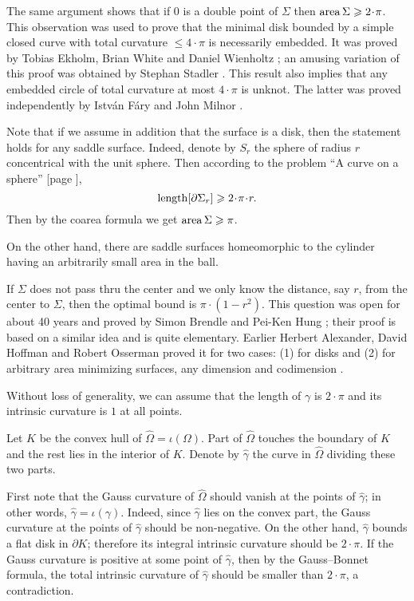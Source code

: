 The same argument shows that if $0$ is a double point
of $\Sigma$ then $\area\Sigma\z\ge 2\cdot \pi$.
This observation was used to prove 
that the minimal disk bounded by a simple closed curve with total curvature $\le 4\cdot\pi$ 
is necessarily embedded.
It was proved by 
Tobias Ekholm, 
Brian White 
and Daniel Wienholtz
\cite{EWW};
an amusing variation of this proof
was obtained by 
Stephan Stadler \cite{stadler-FM}.
This result also implies that any embedded circle of total curvature at most $4\cdot\pi$ is unknot.
The latter was proved independently by Istv{\'a}n F{\'a}ry \cite{fary-knot} and  John Milnor \cite{milnor}.

Note that if we assume in addition that the surface is a disk,
then the statement holds for any saddle surface. 
Indeed, denote by $S_r$ the sphere of radius $r$ concentrical with the unit sphere. 
Then according to the problem ``A curve on a sphere'' [page \pageref{A curve in a sphere}], 
\[\length[\partial\Sigma_r]\ge 2\cdot\pi\cdot r.\]
Then by the coarea formula we get $\operatorname{\rm area}\nolimits\Sigma\geqslant \pi$.

On the other hand, there are saddle surfaces homeomorphic to the cylinder
having an arbitrarily small area in the ball. 

If $\Sigma$ does not pass thru the center 
and we only know the distance, say $r$, 
from the center to $\Sigma$,
then the optimal bound is $\pi\cdot(1-r^2)$.
This question was open for about 40 years and proved by Simon Brendle and Pei-Ken Hung \cite{brende-hung};
their proof is based on a similar idea and is quite elementary.
Earlier Herbert Alexander, 
David Hoffman
and Robert Osserman 
proved it for two cases: (1) for disks and (2) for arbitrary area minimizing surfaces, any dimension and codimension
 \cite{alexander-osserman,alexander-hoffman-osserman}.






Without loss of generality, we can assume that the length of $\gamma$ is $2{\cdot}\pi$ and its intrinsic curvature is $1$ at all points.

Let $K$ be the convex hull of $\hat\Omega=\iota(\Omega)$.
Part of $\hat\Omega$ touches the boundary of $K$ and the rest lies in the interior of $K$. 
Denote by $\hat\gamma$ the curve in $\hat\Omega$ dividing these two parts.

First note that the Gauss curvature of $\hat\Omega$ should vanish at the points of $\hat\gamma$;
in other words, $\hat\gamma=\iota(\gamma)$.
Indeed, since $\hat\gamma$ lies on the convex part, 
the Gauss curvature at the points of $\hat\gamma$ should be non-negative. 
On the other hand, $\hat\gamma$ bounds a flat disk in $\partial K$;
therefore its integral intrinsic curvature should be $2{\cdot}\pi$.
If the Gauss curvature is positive at some point of $\hat\gamma$, 
then by the Gauss--Bonnet formula, the total intrinsic curvature of $\hat\gamma$ should be smaller than $2{\cdot}\pi$, a contradiction.

